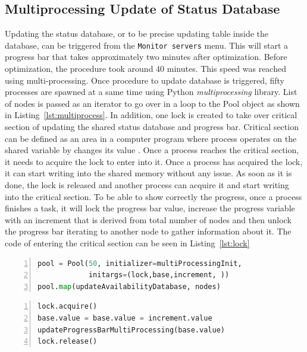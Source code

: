 {{{{\subsection{Multiprocessing Update of Status Database}
Updating the status database, or to be precise updating table inside the database, can be triggered from the \texttt{Monitor servers} menu. This will start a progress bar that takes approximately two minutes after optimization. Before optimization, the procedure took around 40 minutes. This speed was reached using multi-processing. Once procedure to update database is triggered, fifty processes are spawned at a same time using Python \textit{multiprocessing} library. List of nodes is passed as an iterator to go over in a loop to the Pool object as shown in Listing~\ref{lst:multiprocess}. In addition, one lock is created to take over critical section of updating the shared status database and progress bar. Critical section can be defined as an area in a computer program where process operates on the shared variable by changes its value \cite{gebali2011algorithms}. Once a process reaches the critical section, it needs to acquire the lock to enter into it. Once a process has acquired the lock, it can start writing into the shared memory without any issue. As soon as it is done, the lock is released and another process can acquire it and start writing into the critical section. To be able to show correctly the progress, once a process finishes a task, it will lock the progress bar value, increase the progress variable with an increment that is derived from total number of nodes and then unlock the progress bar iterating to another node to gather information about it. The code of entering the critical section can be seen in  Listing~\ref{lst:lock}\\
 
{\noindent\begin{minipage}{\linewidth}
		\begin{lstlisting}[language=Python, numbers=left, label={lst:multiprocess}, caption=Creating a multi-processing object with fifty processes\, three shared variables and list of nodes as iterator., frame=single, showstringspaces=false, breaklines=true, keywordstyle=\color{blue},captionpos=b]
pool = Pool(50, initializer=multiProcessingInit,
			initargs=(lock,base,increment, ))
pool.map(updateAvailabilityDatabase, nodes)
		\end{lstlisting}
	\end{minipage} 

{\noindent\begin{minipage}{\linewidth}
		\begin{lstlisting}[language=Python, numbers=left, label={lst:lock}, caption=Entering a critical section and acquiring a lock., frame=single, showstringspaces=false, breaklines=true, keywordstyle=\color{blue},captionpos=b]
lock.acquire()
base.value = base.value = increment.value
updateProgressBarMultiProcessing(base.value)
lock.release()
		\end{lstlisting}
	\end{minipage} 

}}}}}}
